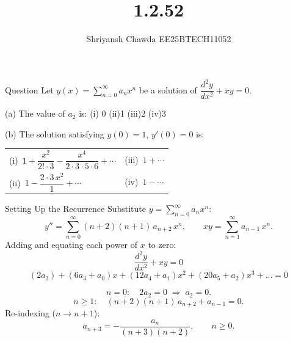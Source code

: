 \documentclass{beamer}
\title{1.2.52}
\author{Shriyansh Chawda EE25BTECH11052}
\begin{document}
	
	\begin{frame}
		\titlepage
	\end{frame}
	
	\begin{frame}{Question}
		Let $y(x) = \displaystyle\sum_{n=0}^{\infty} a_n x^n$ be a solution of
		$\dfrac{d^2y}{dx^2} + xy = 0$.
		
		\vspace{0.6em}
		(a) The value of $a_2$ is: (i) 0 \quad(ii)1 \quad(iii)2 \quad(iv)3
		
		\vspace{0.6em}
		(b) The solution satisfying $y(0)=1$, $y'(0)=0$ is:
		
		\vspace{0.4em}
		\begin{tabular}{ll}
			(i)~$1 + \dfrac{x^2}{2!\cdot3} - \dfrac{x^4}{2\cdot3\cdot5\cdot6} + \cdots$ &
			(iii)~$1 + \cdots$ \\[10pt]
			(ii)~$1 - \dfrac{2\cdot3\,x^2}{1} + \cdots$ &
			(iv)~$1 - \cdots$
		\end{tabular}
	\end{frame}
	
	\begin{frame}{Setting Up the Recurrence}
		Substitute $y = \sum_{n=0}^{\infty} a_n x^n$:
		\begin{equation}
			y'' = \sum_{n=0}^{\infty}(n+2)(n+1)\,a_{n+2}\,x^n, \qquad
			xy  = \sum_{n=1}^{\infty} a_{n-1}\,x^n.
		\end{equation}
		Adding and equating each power of $x$ to zero:
		\\
		\begin{equation}
			\dfrac{d^2y}{dx^2} + xy = 0
		\end{equation}
		\begin{equation}
			(2a_2) + (6a_3 + a_0)x + (12a_4 + a_1)x^2 + (20a_5 + a_2)x^3 + \dots = 0
		\end{equation}
		
		\begin{equation}
			n=0:\quad 2a_2 = 0 \;\Longrightarrow\; a_2 = 0.
		\end{equation}
		\begin{equation}
			n\ge 1:\quad (n+2)(n+1)\,a_{n+2} + a_{n-1} = 0.
		\end{equation}
		Re-indexing ($n \to n+1$):
		\begin{equation}
			a_{n+3} = -\frac{a_n}{(n+3)(n+2)}, \qquad n \ge 0.
		\end{equation}
		
	\end{frame}
	
\end{document}
